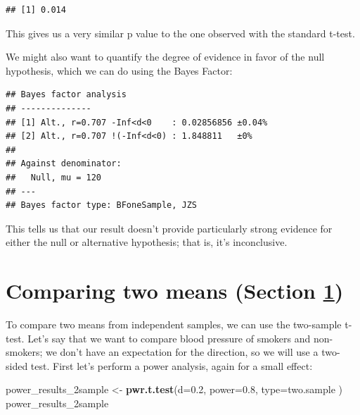 \documentclass[
  12pt,
]{book}
\newenvironment{Shaded}{\begin{snugshade}}{\end{snugshade}}
\newcommand{\AttributeTok}[1]{\textcolor[rgb]{0.13,0.29,0.53}{#1}}
\newcommand{\ConstantTok}[1]{\textcolor[rgb]{0.56,0.35,0.01}{#1}}
\newcommand{\DecValTok}[1]{\textcolor[rgb]{0.00,0.00,0.81}{#1}}
\newcommand{\FloatTok}[1]{\textcolor[rgb]{0.00,0.00,0.81}{#1}}
\newcommand{\FunctionTok}[1]{\textcolor[rgb]{0.13,0.29,0.53}{\textbf{#1}}}
\newcommand{\NormalTok}[1]{#1}
\newcommand{\OtherTok}[1]{\textcolor[rgb]{0.56,0.35,0.01}{#1}}
\newcommand{\SpecialCharTok}[1]{\textcolor[rgb]{0.81,0.36,0.00}{\textbf{#1}}}
\newcommand{\StringTok}[1]{\textcolor[rgb]{0.31,0.60,0.02}{#1}}
\begin{document}
\begin{verbatim}
## [1] 0.014
\end{verbatim}

This gives us a very similar p value to the one observed with the standard t-test.

We might also want to quantify the degree of evidence in favor of the null hypothesis, which we can do using the Bayes Factor:

\begin{Shaded}
\end{Shaded}

\begin{verbatim}
## Bayes factor analysis
## --------------
## [1] Alt., r=0.707 -Inf<d<0    : 0.02856856 ±0.04%
## [2] Alt., r=0.707 !(-Inf<d<0) : 1.848811   ±0%
## 
## Against denominator:
##   Null, mu = 120 
## ---
## Bayes factor type: BFoneSample, JZS
\end{verbatim}

This tells us that our result doesn't provide particularly strong evidence for either the null or alternative hypothesis; that is, it's inconclusive.

\hypertarget{comparing-two-means}{%
\section{Comparing two means (Section \ref{comparing-two-means})}\label{comparing-two-means}}

To compare two means from independent samples, we can use the two-sample t-test. Let's say that we want to compare blood pressure of smokers and non-smokers; we don't have an expectation for the direction, so we will use a two-sided test. First let's perform a power analysis, again for a small effect:

\begin{Shaded}
\begin{Highlighting}[]
\NormalTok{power\_results\_2sample }\OtherTok{\textless{}{-}} \FunctionTok{pwr.t.test}\NormalTok{(}\AttributeTok{d=}\FloatTok{0.2}\NormalTok{, }\AttributeTok{power=}\FloatTok{0.8}\NormalTok{,}
                                    \AttributeTok{type=}\StringTok{\textquotesingle{}two.sample\textquotesingle{}}
\NormalTok{                                    )}
\NormalTok{power\_results\_2sample}
\end{Highlighting}
\end{Shaded}
\end{document}
